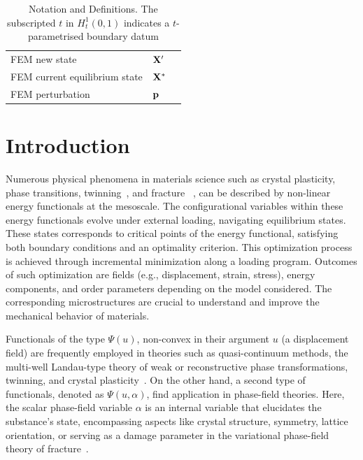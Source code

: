 \begin{table}[h!]
\begin{tabular}{  m{}  m{3cm}  m{5.5cm}  }
        FEM new state                       & $\mathbf{X}'$                                     &                                                                                 \\
        FEM current equilibrium state       & $\mathbf{X^*}$                                 &                                                                                 \\
        FEM perturbation                    & $\mathbf{p}$                                      &                                                                                 \\
    \end{tabular}
    \caption{Notation and Definitions. The subscripted $t$ in $H_t^1(0, 1)$ indicates a $t$-parametrised boundary datum}
    \label{table:notation}
\end{table}

\section{Introduction}
Numerous physical phenomena in materials science such as crystal plasticity, phase transitions, twinning~\cite{Clayton2011-xq}, and fracture ~\cite{francfort_marigo1998,Baldelli2014-ho,Baldelli2021-gc}, can be described by non-linear energy functionals at the mesoscale.
% 
% 
The configurational variables within these energy functionals evolve under external loading, navigating equilibrium states. These states corresponds to critical points of the energy functional, satisfying both boundary conditions and an optimality criterion.
This optimization process is achieved through incremental minimization along a loading program. Outcomes of such optimization are fields
(e.g., displacement, strain, stress), energy components, and order parameters depending on the model considered. The corresponding microstructures are crucial to understand and improve the mechanical behavior of materials.


Functionals of the type $\Psi(u)$, non-convex in their argument  $u$ (a displacement field) are frequently employed in theories such as quasi-continuum methods, the multi-well Landau-type theory of weak or reconstructive phase transformations, twinning, and crystal plasticity~\cite{Tadmor1996-qi,Lookman2003-gd,Conti2004-yj,Finel2010-zw,Clayton2011-xq,Salman2019-cg,Baggio2019-rs,Baggio2023-qu}. On the other hand, a second type of functionals, denoted as $\Psi(u, \alpha)$, find application in phase-field theories. Here, the scalar phase-field variable $\alpha$ is an internal variable that elucidates the substance's state, encompassing aspects like crystal structure, symmetry, lattice orientation, \cite{Finel2010-zw,Ruffini2015-pn,Javanbakht2016-dr} or serving as a damage parameter in the variational phase-field theory of fracture~\cite{francfort_marigo1998,Salman2021-mn}.

